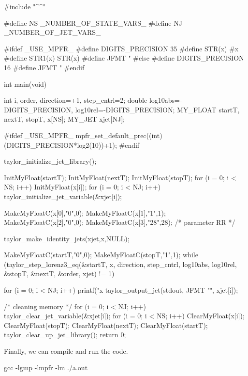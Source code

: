 \documentclass[10pt]{article}
\theoremstyle{remark}
\newcommand{\mainfile}{}
\newcommand{\odecfile}{}
\newcommand{\odehfile}{}
\begin{document}
\begin{code}[title={File: \mainfile{}}]
    #include "^\odehfile{}^"
        
    #define NS _NUMBER_OF_STATE_VARS_
    #define NJ _NUMBER_OF_JET_VARS_
    
    #ifdef _USE_MPFR_
    #define DIGITS_PRECISION 35
    #define STR(x) #x
    #define STR1(x) STR(x)
    #define JFMT "%
    #else 
    #define DIGITS_PRECISION 16
    #define JFMT "%
    #endif
    
    int main(void)
    {
      int i, order, direction=+1, step_cntrl=2;
      double log10abs=-DIGITS_PRECISION, log10rel=-DIGITS_PRECISION;
      MY_FLOAT startT, nextT, stopT, x[NS];
      MY_JET xjet[NJ];
      
    #ifdef _USE_MPFR_
      mpfr_set_default_prec((int)(DIGITS_PRECISION*log2(10))+1);
    #endif
      
      taylor_initialize_jet_library();
      
      InitMyFloat(startT); InitMyFloat(nextT); InitMyFloat(stopT);
      for (i = 0; i < NS; i++) {InitMyFloat(x[i]);}    
      for (i = 0; i < NJ; i++) {taylor_initialize_jet_variable(&xjet[i]);}
      
      MakeMyFloatC(x[0],"0",0);
      MakeMyFloatC(x[1],"1",1);
      MakeMyFloatC(x[2],"0",0); 
      MakeMyFloatC(x[3],"28",28); /* parameter RR */
      
      taylor_make_identity_jets(xjet,x,NULL);
      
      MakeMyFloatC(startT,"0",0);
      MakeMyFloatC(stopT,"1",1);
      while (taylor_step_lorenz3_eq(&startT, x, direction, 
                                    step_cntrl, log10abs, log10rel, 
                                    &stopT, &nextT, &order, xjet) != 1) {}
      
      for (i = 0; i < NJ; i++) {
        printf("x%
        taylor_output_jet(stdout, JFMT "\n", xjet[i]);
      }
      
      /* cleaning memory */
      for (i = 0; i < NJ; i++) {taylor_clear_jet_variable(&xjet[i]);}
      for (i = 0; i < NS; i++)  {ClearMyFloat(x[i]);}
      ClearMyFloat(stopT); ClearMyFloat(nextT); ClearMyFloat(startT); 
      taylor_clear_up_jet_library();
      return 0;
    } 
\end{code}
Finally, we can compile and run the code.
\begin{command}
    gcc \mainfile{} \odecfile{} -lgmp -lmpfr -lm
    ./a.out
\end{command}
\end{document}
